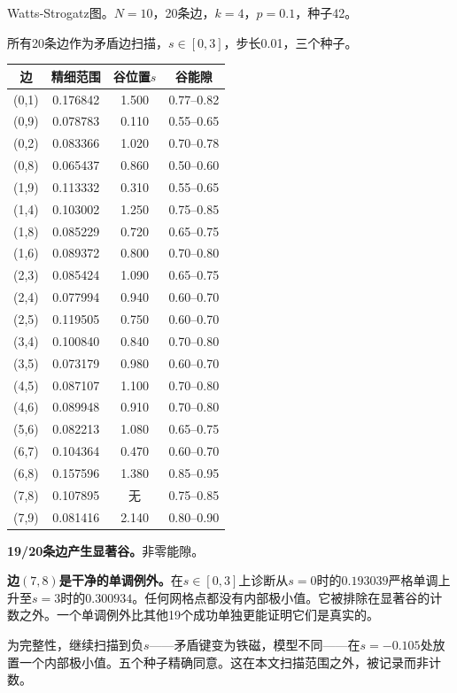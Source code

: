 \documentclass[11pt,a4paper]{book}
\theoremstyle{definition}
\begin{document}
Watts-Strogatz图。$N=10$，20条边，$k=4$，$p=0.1$，种子42。

所有20条边作为矛盾边扫描，$s\in[0,3]$，步长0.01，三个种子。

\begin{table}[h]
\centering
\begin{tabular}{cccc}
\toprule
边 & 精细范围 & 谷位置$s$ & 谷能隙 \\
\midrule
(0,1) & 0.176842 & 1.500 & 0.77--0.82 \\
(0,9) & 0.078783 & 0.110 & 0.55--0.65 \\
(0,2) & 0.083366 & 1.020 & 0.70--0.78 \\
(0,8) & 0.065437 & 0.860 & 0.50--0.60 \\
(1,9) & 0.113332 & 0.310 & 0.55--0.65 \\
(1,4) & 0.103002 & 1.250 & 0.75--0.85 \\
(1,8) & 0.085229 & 0.720 & 0.65--0.75 \\
(1,6) & 0.089372 & 0.800 & 0.70--0.80 \\
(2,3) & 0.085424 & 1.090 & 0.65--0.75 \\
(2,4) & 0.077994 & 0.940 & 0.60--0.70 \\
(2,5) & 0.119505 & 0.750 & 0.60--0.70 \\
(3,4) & 0.100840 & 0.840 & 0.70--0.80 \\
(3,5) & 0.073179 & 0.980 & 0.60--0.70 \\
(4,5) & 0.087107 & 1.100 & 0.70--0.80 \\
(4,6) & 0.089948 & 0.910 & 0.70--0.80 \\
(5,6) & 0.082213 & 1.080 & 0.65--0.75 \\
(6,7) & 0.104364 & 0.470 & 0.60--0.70 \\
(6,8) & 0.157596 & 1.380 & 0.85--0.95 \\
(7,8) & 0.107895 & 无 & 0.75--0.85 \\
(7,9) & 0.081416 & 2.140 & 0.80--0.90 \\
\bottomrule
\end{tabular}
\end{table}

\textbf{19/20条边产生显著谷。}非零能隙。

\textbf{边$(7,8)$是干净的单调例外。}在$s\in[0,3]$上诊断从$s=0$时的$0.193039$严格单调上升至$s=3$时的$0.300934$。任何网格点都没有内部极小值。它被排除在显著谷的计数之外。一个单调例外比其他19个成功单独更能证明它们是真实的。

为完整性，继续扫描到负$s$——矛盾键变为铁磁，模型不同——在$s=-0.105$处放置一个内部极小值。五个种子精确同意。这在本文扫描范围之外，被记录而非计数。
\end{document}
